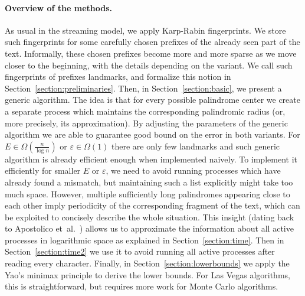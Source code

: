 \documentclass{article}[11pt,letter]
\newcommand{\aerr}{\ensuremath{E}}
\newcommand{\etal}{et~al.}
\begin{document}
\paragraph{Overview of the methods.} As usual in the streaming model, we apply Karp-Rabin fingerprints. We store
such fingerprints for some carefully chosen prefixes of the already seen part of the text. Informally, these chosen
prefixes become more and more sparse as we move closer to the beginning, with the details depending on the
variant. We call such fingerprints of prefixes landmarks, and formalize this notion in Section~\ref{section:preliminaries}. Then, in Section~\ref{section:basic}, we present
a generic algorithm. The idea is that for every possible palindrome center we create a separate process
which maintains the corresponding palindromic radius (or, more precisely, its approximation).
By adjusting the parameters of the generic algorithm we are able to guarantee good bound on the error
in both variants.
For $\aerr \in \Omega(\frac{n}{\log n})$ or $\varepsilon \in \Omega(1)$ there are only few landmarks and such generic algorithm
is already efficient enough when implemented naively. To implement it efficiently for smaller $\aerr$
or $\varepsilon$, we need to avoid running processes which have already found
a mismatch, but maintaining such a list explicitly might take too much space. However, multiple sufficiently
long palindromes appearing close to each other imply periodicity of the corresponding fragment of the text, which
can be exploited to concisely describe the whole situation.
This insight (dating back to Apostolico \etal~\cite{Apostolico})
allows us to approximate the information about all active processes in logarithmic space as explained
in Section~\ref{section:time}. Then in Section~\ref{section:time2} we use it to avoid running all active processes after
reading every character.
Finally, in Section~\ref{section:lowerbounds} we apply the Yao's minimax principle to derive the
lower bounds. For Las Vegas algorithms, this is straightforward, but requires more work for Monte Carlo algorithms.
\end{document}
